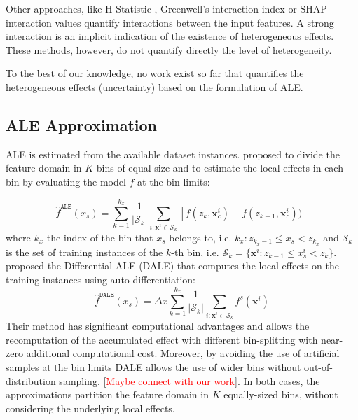 \documentclass[twoside]{article}
\newcommand{\xc}{\mathbf{x}_c}
\newcommand{\xb}{\mathbf{x}}
\newcommand{\todo}[1]{[\textcolor{red}{#1}]}
\begin{document}
Other approaches, like H-Statistic \citep{friedman2008predictive},
Greenwell's interaction index \citep{greenwell2018simple} or SHAP
interaction values \citep{lundberg2018consistent} quantify
interactions between the input features. A strong interaction is
  an implicit indication of the existence of heterogeneous effects. These
  methods, however, do not quantify directly the level of heterogeneity.

To the best of our knowledge, no work exist so far that quantifies the
heterogeneous effects (uncertainty) based on the formulation of ALE.

\subsection{ALE Approximation}
\label{sec:ale-approximation}

ALE is estimated from the available dataset instances. \citep{apley2020visualizing} proposed to divide the feature
domain in \(K\) bins of equal size and to estimate the local effects
in each bin by evaluating the model \(f\) at the bin limits:

\begin{equation}
  \label{eq:ALE_accumulated_mean_est}
  \hat{f}^{\mathtt{ALE}}(x_s) = \sum_{k=1}^{k_x} \frac{1}{|\mathcal{S}_k|} \sum_{i:\mathbf{x}^i \in
    \mathcal{S}_k} \left [ f(z_{k}, \xc^i) - f(z_{k-1}, \xc^i)) \right ]
\end{equation}
%
where \(k_x\) the index of the bin that \(x_s\) belongs to,
i.e. \(k_x: z_{k_x-1} \leq x_s < z_{k_x} \) and \(\mathcal{S}_k\) is
the set of training instances of the \(k\)-th bin, i.e.
\( \mathcal{S}_k = \{ \xb^i : z_{k-1} \leq x^i_s < z_{k} \}
\). \citep{gkolemis22} proposed the Differential ALE (DALE) that
computes the local effects on the training instances using
auto-differentiation:
\begin{equation}  \label{eq:DALE_accumulated_mean_est}
  \hat{f}^{\mathtt{DALE}}(x_s) = \Delta x \sum_{k=1}^{k_x} \frac{1}{|\mathcal{S}_k|} \sum_{i:\mathbf{x}^i \in
    \mathcal{S}_k} f^s(\mathbf{x}^i)
\end{equation}
%
Their method has significant computational advantages and allows the
recomputation of the accumulated effect with different bin-splitting
with near-zero additional computational cost. Moreover, by avoiding
the use of artificial samples at the bin limits DALE allows the use of
wider bins without out-of-distribution sampling. \todo{Maybe connect with our work}. In both cases, the
approximations partition the feature domain in \(K\) equally-sized
bins, without considering the underlying local effects.
\end{document}
